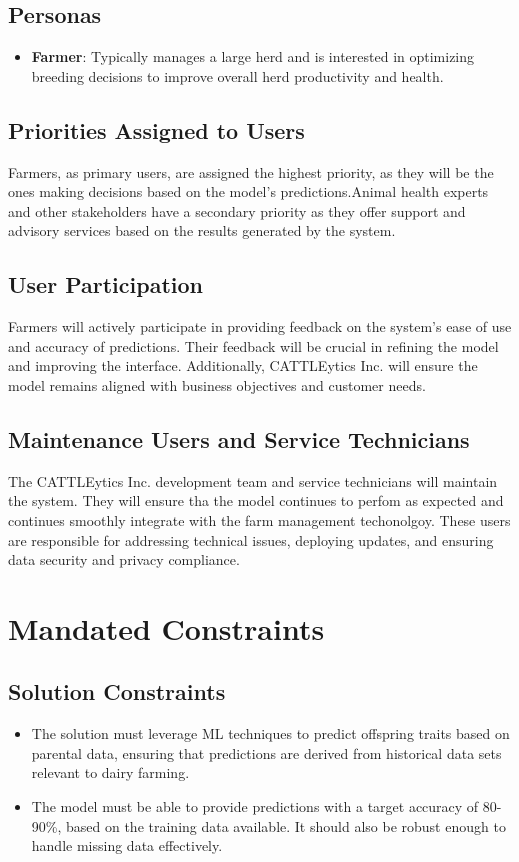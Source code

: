 \documentclass[12pt]{article}
\begin{document}
\subsection{Personas}
\begin{itemize}
    \item \textbf{Farmer}: Typically manages a large herd and is interested in 
    optimizing breeding decisions to improve overall herd productivity and 
    health.

\end{itemize}

\subsection{Priorities Assigned to Users}
Farmers, as primary users, are assigned the highest priority, as they will be 
the ones making decisions based on the model's predictions.Animal health 
experts and other stakeholders have a secondary priority as they offer support 
and advisory services based on the results generated by the system.

\subsection{User Participation}
Farmers will actively participate in providing feedback on the system's ease of 
use and accuracy of predictions. Their feedback will be crucial in refining the 
model and improving the interface. Additionally, CATTLEytics Inc. will ensure 
the model remains aligned with business objectives and customer needs.

\subsection{Maintenance Users and Service Technicians}
The CATTLEytics Inc. development team and service technicians will maintain the 
system. They will ensure tha the model continues to perfom as expected and 
continues smoothly integrate with the farm management techonolgoy. These users 
are responsible for addressing technical issues, deploying updates, and 
ensuring data security and privacy compliance.

\section{Mandated Constraints}

\subsection{Solution Constraints}
\begin{itemize}
    \item The solution must leverage ML techniques to predict offspring traits 
    based on parental data, ensuring that predictions are derived from 
    historical data sets relevant to dairy farming.
    \item The model must be able to provide predictions with a target accuracy 
    of 80-90\%, based on the training data available. It should also be robust 
    enough to handle missing data effectively. 
\end{itemize}
\end{document}
